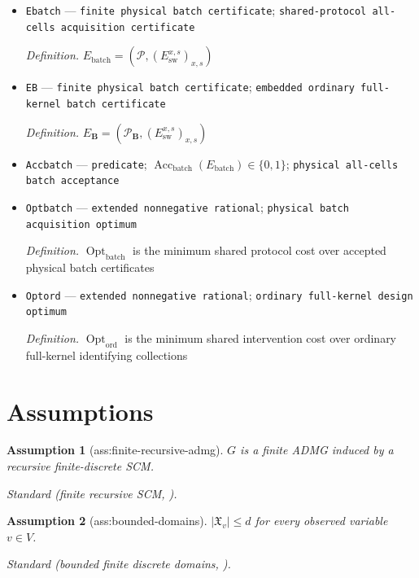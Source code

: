 \documentclass{article}
\newtheorem{assumption}{Assumption}
\begin{document}
\begin{itemize}
  \item \texttt{Ebatch} --- \texttt{finite physical batch certificate}; \texttt{shared-\allowbreak{}protocol all-\allowbreak{}cells acquisition certificate}
  \par\smallskip\noindent\emph{Definition.} \(E_{\mathrm{batch}}=(\mathcal P,(E_{\mathrm{sw}}^{x,s})_{x,s})\)
  \item \texttt{EB} --- \texttt{finite physical batch certificate}; \texttt{embedded ordinary full-\allowbreak{}kernel batch certificate}
  \par\smallskip\noindent\emph{Definition.} \(E_{\mathbf B}=(\mathcal P_{\mathbf B},(E_{\mathrm{sw}}^{x,s})_{x,s})\)
  \item \texttt{Accbatch} --- \texttt{predicate}; \(\operatorname{Acc}_{\mathrm{batch}}(E_{\mathrm{batch}})\in\{0,1\}\); \texttt{physical all-\allowbreak{}cells batch acceptance}
  \item \texttt{Optbatch} --- \texttt{extended nonnegative rational}; \texttt{physical batch acquisition optimum}
  \par\smallskip\noindent\emph{Definition.} \(\operatorname{Opt}_{\mathrm{batch}}\) is the minimum shared protocol cost over accepted physical batch certificates
  \item \texttt{Optord} --- \texttt{extended nonnegative rational}; \texttt{ordinary full-\allowbreak{}kernel design optimum}
  \par\smallskip\noindent\emph{Definition.} \(\operatorname{Opt}_{\mathrm{ord}}\) is the minimum shared intervention cost over ordinary full-kernel identifying collections
\end{itemize}

\section{Assumptions}

\begin{assumption}[ass:finite-recursive-admg]\label{ass:finite-recursive-admg}
\(G\) is a finite ADMG induced by a recursive finite-discrete SCM.
\par\smallskip\noindent\emph{Standard} (finite recursive SCM, \cite{RaghavanBareinboim2025Realizability}).
\end{assumption}

\begin{assumption}[ass:bounded-domains]\label{ass:bounded-domains}
\(|\mathfrak X_v|\le d\) for every observed variable \(v\in V\).
\par\smallskip\noindent\emph{Standard} (bounded finite discrete domains, \cite{RaghavanBareinboim2026CTFIDUPlus}).
\end{assumption}
\end{document}
